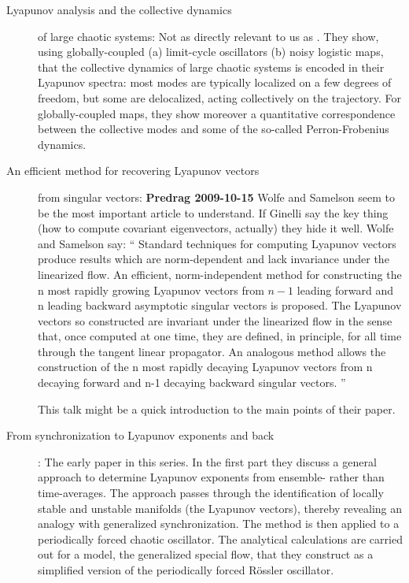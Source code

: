\begin{description}
\item[Lyapunov analysis and the collective dynamics]
of large chaotic systems:
Not as directly relevant to us as . 
They show, using globally-coupled (a) limit-cycle oscillators 
(b) noisy logistic maps, that the collective dynamics 
of large chaotic systems is encoded in their Lyapunov spectra: 
most modes are typically localized on a few degrees of freedom, 
but some are delocalized, acting collectively on the trajectory. 
For globally-coupled maps, they show moreover a quantitative 
correspondence between the collective modes and some of the 
so-called Perron-Frobenius dynamics.


\item[An efficient method for recovering Lyapunov vectors] from
singular vectors: {\bf Predrag 2009-10-15} Wolfe
and Samelson seem to be the most important article to
understand. If Ginelli \etal{} say the key
thing (how to compute covariant eigenvectors, actually) they
hide it well.
Wolfe and Samelson say: `` Standard techniques for computing
Lyapunov vectors produce results which are norm-dependent and
lack invariance under the linearized flow. An efficient,
norm-independent method for constructing the n most rapidly
growing Lyapunov vectors from $n\!-\!1$ leading forward and n
leading backward asymptotic singular vectors is proposed. The
Lyapunov vectors so constructed are invariant under the
linearized flow in the sense that, once computed at one time,
they are defined, in principle, for all time through the
tangent linear propagator. An analogous method allows the
construction of the n most rapidly decaying Lyapunov vectors
from n decaying forward and n-1 decaying backward singular
vectors. ''

{This talk} might be a quick introduction to the main points of their 
paper.

\item[From synchronization to Lyapunov exponents and
              back]:
The early paper in this series.
In the first part they discuss a general approach to determine
Lyapunov exponents from ensemble- rather than time-averages.
The approach passes through the identification of locally
stable and unstable manifolds (the Lyapunov vectors), thereby
revealing an analogy with generalized synchronization. The
method is then applied to a periodically forced chaotic
oscillator. The
analytical calculations are carried out for a model, the
generalized special flow, that they construct as a simplified
version of the periodically forced R\"ossler oscillator.


\end{description}
